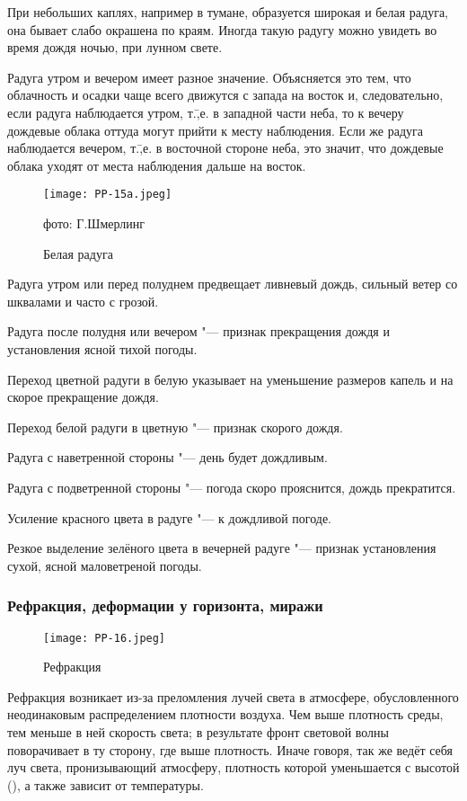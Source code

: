 При небольших каплях, например в тумане, образуется широкая и белая
радуга, она бывает слабо окрашена по краям. Иногда такую радугу можно
увидеть во время дождя ночью, при лунном свете.

Радуга утром и вечером имеет разное значение. Объясняется это тем, что
облачность и осадки чаще всего движутся с запада на восток и,
следовательно, если радуга наблюдается утром, т.\=,е. в западной части
неба, то к вечеру дождевые облака оттуда могут прийти к месту
наблюдения. Если же радуга наблюдается вечером, т.\=,е. в восточной
стороне неба, это значит, что дождевые облака уходят от места
наблюдения дальше на восток.

\begin{figure}[htb]
  \centering{}
  \texttt{[image: PP-15a.jpeg]}
  \caption{Белая радуга}
  \label{fig:pp15a}
  \small
  \centering{}фото: Г.Шмерлинг
\end{figure}

 Радуга утром или перед полуднем предвещает ливневый дождь,
сильный ветер со шквалами и часто с грозой.

 Радуга после полудня или вечером "--- признак прекращения дождя и
установления ясной тихой погоды.

 Переход цветной радуги в белую указывает на уменьшение
размеров капель и на скорое прекращение дождя.

 Переход белой радуги в цветную "--- признак скорого дождя.

 Радуга с наветренной стороны "--- день будет дождливым.

 Радуга с подветренной стороны "--- погода скоро прояснится, дождь прекратится.

 Усиление красного цвета в радуге "--- к дождливой погоде.

 Резкое выделение зелёного цвета в вечерней радуге "--- признак
установления сухой, ясной маловетреной погоды.

\subsubsection{Рефракция, деформации у горизонта, миражи}

\begin{figure}[htb]
  \centering{}
  \texttt{[image: PP-16.jpeg]}
  \caption{Рефракция}
  \label{fig:pp16}
  \small
  \centering{}
\end{figure}

Рефракция возникает из-за преломления лучей света в атмосфере,
обусловленного неодинаковым распределением плотности воздуха. Чем выше
плотность среды, тем меньше в ней скорость света; в результате фронт
световой волны поворачивает в ту сторону, где выше плотность. Иначе
говоря, так же ведёт себя луч света, пронизывающий атмосферу,
плотность которой уменьшается с высотой (), а также зависит от
температуры.


